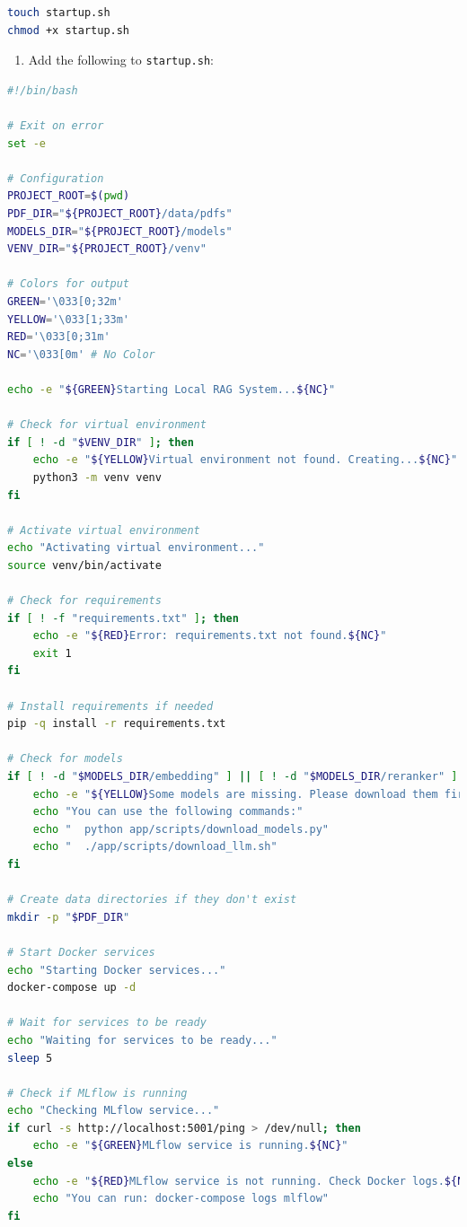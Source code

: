 \documentclass[
  screen,review,acmlarge]{acmart}
\newcommand{\passthrough}[1]{#1}
\providecommand{\tightlist}{%
  \setlength{\itemsep}{0pt}\setlength{\parskip}{0pt}}
\begin{document}
\begin{lstlisting}[language=bash]
touch startup.sh
chmod +x startup.sh
\end{lstlisting}

\begin{enumerate}
\def\labelenumi{\arabic{enumi}.}
\setcounter{enumi}{3}
\tightlist
\item
  Add the following to \passthrough{\lstinline!startup.sh!}:
\end{enumerate}

\begin{lstlisting}[language=bash]
#!/bin/bash

# Exit on error
set -e

# Configuration
PROJECT_ROOT=$(pwd)
PDF_DIR="${PROJECT_ROOT}/data/pdfs"
MODELS_DIR="${PROJECT_ROOT}/models"
VENV_DIR="${PROJECT_ROOT}/venv"

# Colors for output
GREEN='\033[0;32m'
YELLOW='\033[1;33m'
RED='\033[0;31m'
NC='\033[0m' # No Color

echo -e "${GREEN}Starting Local RAG System...${NC}"

# Check for virtual environment
if [ ! -d "$VENV_DIR" ]; then
    echo -e "${YELLOW}Virtual environment not found. Creating...${NC}"
    python3 -m venv venv
fi

# Activate virtual environment
echo "Activating virtual environment..."
source venv/bin/activate

# Check for requirements
if [ ! -f "requirements.txt" ]; then
    echo -e "${RED}Error: requirements.txt not found.${NC}"
    exit 1
fi

# Install requirements if needed
pip -q install -r requirements.txt

# Check for models
if [ ! -d "$MODELS_DIR/embedding" ] || [ ! -d "$MODELS_DIR/reranker" ] || [ ! -d "$MODELS_DIR/llm" ]; then
    echo -e "${YELLOW}Some models are missing. Please download them first.${NC}"
    echo "You can use the following commands:"
    echo "  python app/scripts/download_models.py"
    echo "  ./app/scripts/download_llm.sh"
fi

# Create data directories if they don't exist
mkdir -p "$PDF_DIR"

# Start Docker services
echo "Starting Docker services..."
docker-compose up -d

# Wait for services to be ready
echo "Waiting for services to be ready..."
sleep 5

# Check if MLflow is running
echo "Checking MLflow service..."
if curl -s http://localhost:5001/ping > /dev/null; then
    echo -e "${GREEN}MLflow service is running.${NC}"
else
    echo -e "${RED}MLflow service is not running. Check Docker logs.${NC}"
    echo "You can run: docker-compose logs mlflow"
fi


\end{lstlisting}
\end{document}
